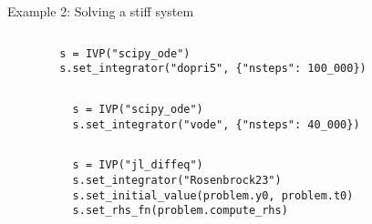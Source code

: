 \documentclass[10pt, aspectratio=169, progressbar=frametitle]{beamer}
\begin{document}
\begin{frame}[fragile]{Example 2: Solving a stiff system}
    \begin{columns}
      \begin{verbatim}
        s = IVP("scipy_ode")
        s.set_integrator("dopri5", {"nsteps": 100_000})
      \end{verbatim}
    \end{columns}

    \vspace{3em}
    \begin{columns}
        \begin{verbatim}
          s = IVP("scipy_ode")
          s.set_integrator("vode", {"nsteps": 40_000})
        \end{verbatim}

    \end{columns}

    \vspace{3em}
    \begin{columns}
        \begin{verbatim}
          s = IVP("jl_diffeq")
          s.set_integrator("Rosenbrock23")
          s.set_initial_value(problem.y0, problem.t0)
          s.set_rhs_fn(problem.compute_rhs)
        \end{verbatim}
    \end{columns}
\end{frame}
\end{document}
